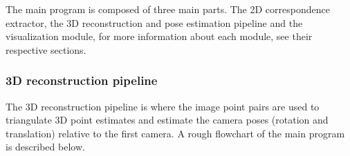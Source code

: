 The main program is composed of three main parts. The 2D correspondence extractor, the 3D reconstruction and pose estimation pipeline and the visualization module, for more information about each module, see their respective sections.


\subsubsection{3D reconstruction pipeline}
The 3D reconstruction pipeline is where the image point pairs are used to triangulate 3D point estimates and estimate the camera poses (rotation and translation) relative to the first camera. A rough flowchart of the main program is described below.